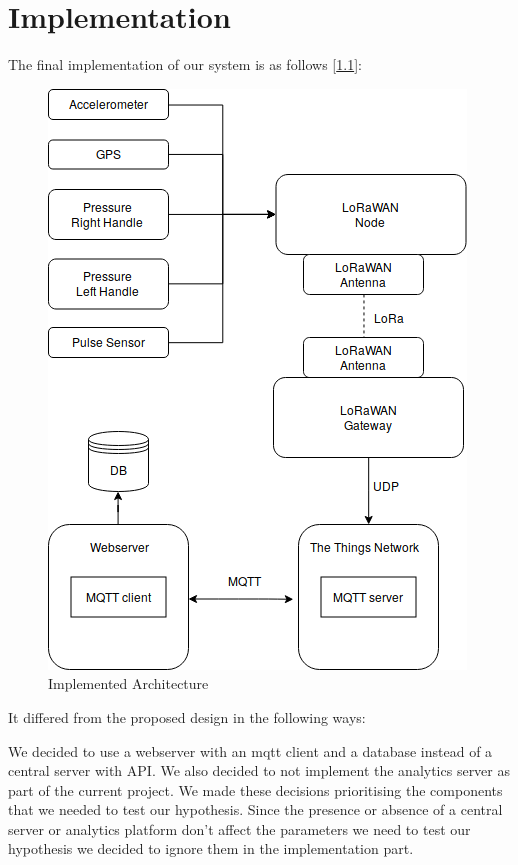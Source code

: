 \chapter{Implementation}
\label{cha:implementation}

The final implementation of our system is as follows [\ref{fig:architecture2}]:
\begin{figure}[h!]
\centering
\includegraphics[width=1\linewidth]{gfx/architecture_implementation_h}
\caption{Implemented Architecture}
\label{fig:architecture2}
\end{figure}

It differed from the proposed design in the following ways:

We decided to use a webserver with an mqtt client and a database instead of a central server with API. We also decided to not implement the analytics server as part of the current project. We made these decisions prioritising the components that we needed to test our hypothesis. Since the presence or absence of a central server or analytics platform don't affect the parameters we need to test our hypothesis we decided to ignore them in the implementation part.


